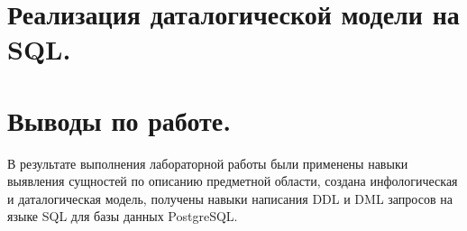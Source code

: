 \newpage

\section{Реализация даталогической модели на SQL.}
\tiny


\normalsize

\newpage

\section{Выводы по работе.}
В результате выполнения лабораторной работы были применены навыки выявления
сущностей по описанию предметной области, создана инфологическая и даталогическая
модель, получены навыки написания DDL и DML запросов на языке SQL для базы данных
PostgreSQL.